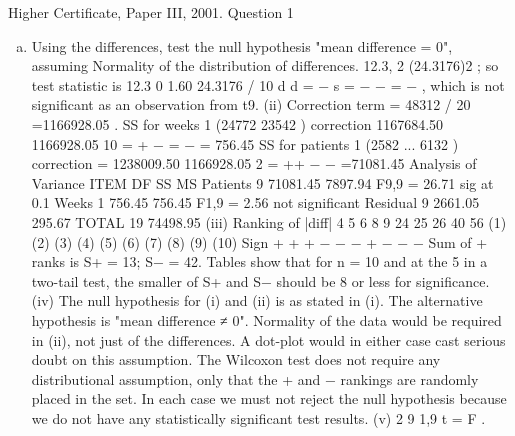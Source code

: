 \documentclass[a4paper,12pt]{article}
\begin{document}

Higher Certificate, Paper III, 2001. Question 1
\begin{enumerate}[(a)]
\item  Using the differences, test the null hypothesis "mean difference = 0", assuming
Normality of the distribution of differences.
12.3, 2 (24.3176)2 ; so test statistic is 12.3 0 1.60
24.3176 / 10 d d = − s = − − = − , which is not
significant as an observation from t9.
(ii) Correction term = 48312 / 20 =1166928.05 .
SS for weeks 1 (24772 23542 ) correction 1167684.50 1166928.05
10
= + − = −
= 756.45
SS for patients 1 (2582 ... 6132 ) correction = 1238009.50 1166928.05
2
= ++ − −
=71081.45
Analysis of Variance
ITEM DF SS MS
Patients 9 71081.45 7897.94 F9,9 = 26.71 sig at 0.1%
Weeks 1 756.45 756.45 F1,9 = 2.56 not significant
Residual 9 2661.05 295.67
TOTAL 19 74498.95
(iii)
Ranking of |diff| 4 5 6 8 9 24 25 26 40 56
(1) (2) (3) (4) (5) (6) (7) (8) (9) (10)
Sign + + + − − − + − − −
Sum of + ranks is S+ = 13; S− = 42. Tables show that for n = 10 and at the 5%
in a two-tail test, the smaller of S+ and S− should be 8 or less for significance.
(iv) The null hypothesis for (i) and (ii) is as stated in (i). The alternative
hypothesis is "mean difference ≠ 0". Normality of the data would be required in (ii),
not just of the differences. A dot-plot would in either case cast serious doubt on this
assumption. The Wilcoxon test does not require any distributional assumption, only
that the + and − rankings are randomly placed in the set. In each case we must not
reject the null hypothesis because we do not have any statistically significant test
results.
(v) 2
9 1,9 t = F .


\end{enumerate}
\end{document}
